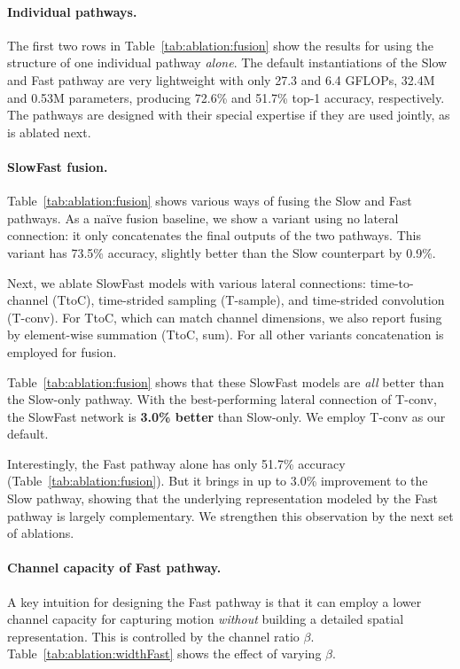 \documentclass[10pt,twocolumn,letterpaper]{article}
\newcommand{\tblref}[1]{Table~\ref{#1}}
\renewcommand{\phi}{\beta}
\begin{document}
	\paragraph{Individual pathways.} The first two rows in \tblref{tab:ablation:fusion} show the results for using the structure of one individual pathway \emph{alone}. The default instantiations of the Slow and Fast pathway are very lightweight with only 27.3 and 6.4 GFLOPs, 32.4M and 0.53M parameters, producing 72.6\% and 51.7\% top-1 accuracy, respectively. The pathways are designed with their special expertise if they are used jointly, as is ablated next.
	
	\paragraph{SlowFast fusion.} \tblref{tab:ablation:fusion} shows various ways of fusing the Slow and Fast pathways.
	As a na\"ive fusion baseline, we show a variant using no lateral connection: it only concatenates the final outputs of the two pathways. This variant has 73.5\% accuracy, slightly better than the Slow counterpart by 0.9\%.
	
	Next, we ablate SlowFast models with various lateral connections: time-to-channel (TtoC), time-strided sampling (T-sample), and time-strided convolution (T-conv). For TtoC, which can match channel dimensions, we also report fusing by element-wise summation (TtoC, sum). For all other variants concatenation is employed for fusion.
	
	\tblref{tab:ablation:fusion} shows that these SlowFast models are \emph{all} better than the Slow-only pathway. With the best-performing lateral connection of T-conv, the SlowFast network is \textbf{3.0\% better} than Slow-only. We employ T-conv as our default.
	
	Interestingly, the Fast pathway alone has only 51.7\% accuracy (\tblref{tab:ablation:fusion}). But it brings in up to 3.0\% improvement to the Slow pathway, showing that the underlying representation modeled by the Fast pathway is largely complementary. We strengthen this observation by the next set of ablations.
	
	\paragraph{Channel capacity of Fast pathway.} A key intuition for designing the Fast pathway is that it can employ a lower channel capacity for capturing motion \emph{without} building a detailed spatial representation. This is controlled by the channel ratio  $\phi$. \tblref{tab:ablation:widthFast} shows the effect of varying $\phi$.
	
\end{document}
